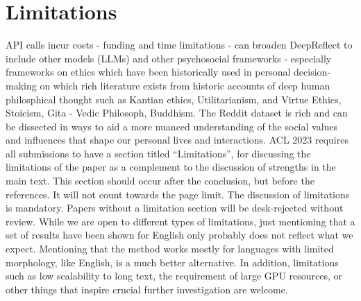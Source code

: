 \section*{Limitations}
\textcolor{black!40}{API calls incur costs - funding and time limitations - can broaden DeepReflect to include other models (LLMs) and other psychosocial frameworks - especially frameworks on ethics which have been historically used in personal decision-making on which rich literature exists from historic accounts of deep human philosphical thought such as Kantian ethics, Utilitarianism, and Virtue Ethics, Stoicism, Gita - Vedic Philosoph, Buddhism. The Reddit dataset is rich and can be dissected in ways to aid a more nuanced understanding of the social values and influences that shape our personal lives and interactions.}
\textcolor{black!30}{ACL 2023 requires all submissions to have a section titled ``Limitations'', for discussing the limitations of the paper as a complement to the discussion of strengths in the main text. This section should occur after the conclusion, but before the references. It will not count towards the page limit.
The discussion of limitations is mandatory. Papers without a limitation section will be desk-rejected without review.}
\textcolor{black!30}{While we are open to different types of limitations, just mentioning that a set of results have been shown for English only probably does not reflect what we expect. Mentioning that the method works mostly for languages with limited morphology, like English, is a much better alternative.}
\textcolor{black!30}{In addition, limitations such as low scalability to long text, the requirement of large GPU resources, or other things that inspire crucial further investigation are welcome.}